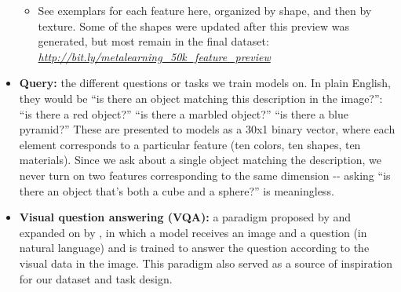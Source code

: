 \begin{itemize}
\begin{itemize}
  \item See exemplars for each feature here, organized by shape, and then by texture. Some of the shapes were updated after this preview was generated, but most remain in the final dataset: \href{http://bit.ly/metalearning_50k_feature_preview}{\emph{http://bit.ly/metalearning\_50k\_feature\_preview}}
    
  \end{itemize}

\item \textbf{Query:\label{tg:query}} the different questions or tasks we train models on. In plain English, they would be ``is there an object matching this description in the image?'': ``is there a red object?'' ``is there a marbled object?'' ``is there a blue pyramid?'' These are presented to models as a 30x1 binary vector, where each element corresponds to a particular feature (ten colors, ten shapes, ten materials). Since we ask about a single object matching the description, we never turn on two features corresponding to the same dimension -\/- asking ``is there an object that's both a cube and a sphere?'' is meaningless.
  
\item \textbf{Visual question answering (VQA):\label{tg:vqa}} a paradigm proposed by \textcite{Antol2015} and expanded on by \textcite{Agrawal2016}, in which a model receives an image and a question (in natural language) and is trained to answer the question according to the visual data in the image. This paradigm also served as a source of inspiration for our dataset and task design.
\end{itemize}